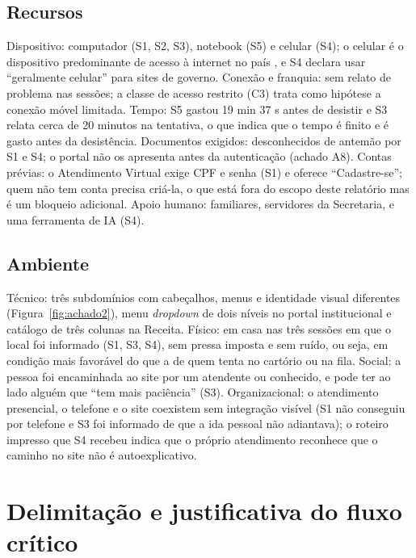 \documentclass[
  12pt,
  oneside,
  a4paper,
  chapter=TITLE,
  section=TITLE,
  english,
  brazilian
]{abntex2}
\begin{document}
\section{Recursos}

Dispositivo: computador (S1, S2, S3), notebook (S5) e celular (S4); o celular é o
dispositivo predominante de acesso à internet no país \cite{ticdomicilios},
e S4 declara usar ``geralmente celular'' para sites de governo. Conexão e
franquia: sem relato de problema nas sessões; a classe de acesso restrito
(C3) trata como hipótese a conexão móvel limitada. Tempo: S5 gastou 19 min 37 s antes de desistir e S3 relata cerca de 20 minutos na tentativa, o que indica que o tempo é finito e é gasto antes da desistência. Documentos exigidos: desconhecidos de antemão por S1 e S4;
o portal não os apresenta antes da autenticação (achado A8). Contas
prévias: o Atendimento Virtual exige CPF e senha (S1) e oferece ``Cadastre-se'';
quem não tem conta precisa criá-la, o que está fora do escopo deste relatório
mas é um bloqueio adicional. Apoio humano: familiares, servidores da
Secretaria, e uma ferramenta de IA (S4).

\section{Ambiente}

Técnico: três subdomínios com cabeçalhos, menus e identidade visual
diferentes (Figura~\ref{fig:achado2}), menu \textit{dropdown} de dois níveis no
portal institucional e catálogo de três colunas na Receita. Físico: em
casa nas três sessões em que o local foi informado (S1, S3, S4), sem pressa
imposta e sem ruído, ou seja, em condição mais favorável do que a de quem tenta
no cartório ou na fila. Social: a pessoa foi encaminhada ao site por um
atendente ou conhecido, e pode ter ao lado alguém que ``tem mais paciência''
(S3). Organizacional: o atendimento presencial, o telefone e o site
coexistem sem integração visível (S1 não conseguiu por telefone e S3 foi
informado de que a ida pessoal não adiantava); o roteiro impresso que S4 recebeu
indica que o próprio atendimento reconhece que o caminho no site não é
autoexplicativo.

\chapter{Delimitação e justificativa do fluxo crítico}\label{cap:fluxo}
\end{document}

